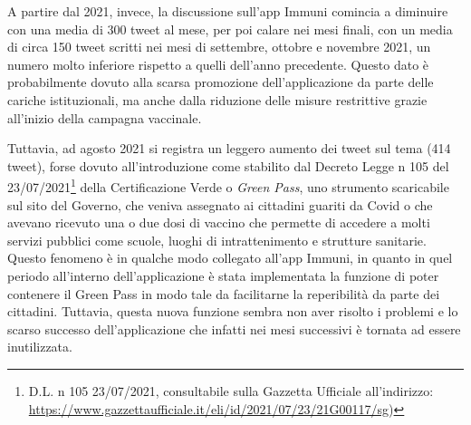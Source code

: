 A partire dal 2021, invece, la discussione sull'app Immuni comincia a diminuire con una media di 300 tweet al mese, per poi calare nei mesi finali, con un media di circa 150 tweet scritti nei mesi di settembre, ottobre e novembre 2021, un numero molto inferiore rispetto a quelli dell'anno precedente. Questo dato è probabilmente dovuto alla scarsa promozione dell'applicazione da parte delle cariche istituzionali, ma anche dalla riduzione delle misure restrittive grazie all'inizio della campagna vaccinale.

Tuttavia, ad agosto 2021 si registra un leggero aumento dei tweet sul tema (414 tweet), forse dovuto all'introduzione come stabilito dal Decreto Legge n 105 del 23/07/2021\footnote{D.L. n 105 23/07/2021, consultabile sulla Gazzetta Ufficiale all'indirizzo: \url{https://www.gazzettaufficiale.it/eli/id/2021/07/23/21G00117/sg})} della Certificazione Verde o \textit{Green Pass}, uno strumento scaricabile sul sito del Governo, che veniva assegnato ai cittadini guariti da Covid o che avevano ricevuto una o due dosi di vaccino che permette di accedere a molti servizi pubblici come scuole, luoghi di intrattenimento e strutture sanitarie. 
Questo fenomeno è in qualche modo collegato all'app Immuni, in quanto in quel periodo all'interno dell'applicazione è stata implementata la funzione di poter contenere il Green Pass in modo tale da facilitarne la reperibilità da parte dei cittadini. 
Tuttavia, questa nuova funzione sembra non aver risolto i problemi e lo scarso successo dell'applicazione che infatti nei mesi successivi è tornata ad essere inutilizzata.








